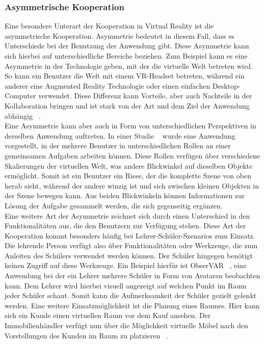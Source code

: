 \subsubsection{Asymmetrische Kooperation}
Eine besondere Unterart der Kooperation in Virtual Reality ist die asymmetrische Kooperation. Asymmetrie bedeutet in diesem Fall, dass es Unterschiede bei der Benutzung der Anwendung gibt. Diese Asymmetrie kann sich hierbei auf unterschiedliche Bereiche beziehen. Zum Beispiel kann es eine Asymmetrie in der Technologie geben, mit der die virtuelle Welt betreten wird. So kann ein Benutzer die Welt mit einem VR-Headset betreten, während ein anderer eine Augmented Reality Technologie oder einen einfachen Desktop-Computer verwendet. Diese Differenz kann Vorteile, aber auch Nachteile in der Kollaboration bringen und ist stark von der Art und dem Ziel der Anwendung abhängig ~\parencite{8798080}. \\

Eine Asymmetrie kann aber auch in Form von unterschiedlichen Perspektiven in derselben Anwendung auftreten. In einer Studie ~\parencite{7563562} wurde eine Anwendung vorgestellt, in der mehrere Benutzer in unterschiedlichen Rollen an einer gemeinsamen Aufgaben arbeiten können. Diese Rollen verfügen über verschiedene Skalierungen der virtuellen Welt, was andere Blickwinkel auf dieselben Objekte ermöglicht. Somit ist ein Benutzer ein Riese, der die komplette Szene von oben herab sieht, während der andere winzig ist und sich zwischen kleinen Objekten in der Szene bewegen kann. Aus beiden Blickwinkeln können Informationen zur Lösung der Aufgabe gesammelt werden, die sich gegenseitig ergänzen. \\

Eine weitere Art der Asymmetrie zeichnet sich durch einen Unterschied in den Funktionalitäten aus, die den Benutzern zur Verfügung stehen. Diese Art der Kooperation kommt besonders häufig bei Lehrer-Schüler-Szenarios zum Einsatz. Die lehrende Person verfügt also über Funktionalitäten oder Werkzeuge, die zum Anleiten des Schülers verwendet werden können. Der Schüler hingegen benötigt keinen Zugriff auf diese Werkzeuge. Ein Beispiel hierfür ist ObserVAR ~\parencite{8943686}, eine Anwendung bei der ein Lehrer mehrere Schüler in Form von Avataren beobachten kann. Dem Lehrer wird hierbei visuell angezeigt auf welchen Punkt im Raum jeder Schüler schaut. Somit kann die Aufmerksamkeit der Schüler gezielt gelenkt werden. Eine weitere Einsatzmöglichkeit ist die Planung eines Raumes. Hier kann sich ein Kunde einen virtuellen Raum vor dem Kauf ansehen. Der Immobilienhändler verfügt nun über die Möglichkeit virtuelle Möbel nach den Vorstellungen des Kunden im Raum zu platzieren ~\parencite{7223433}. \\

